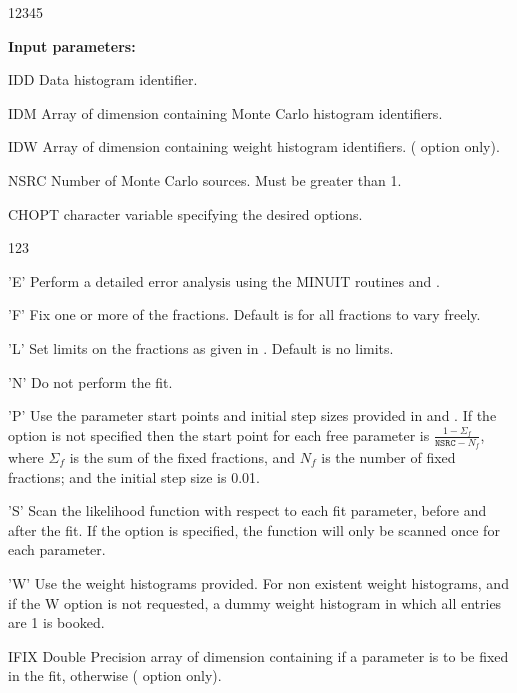 \begin{DLtt}{12345}
\item[{\rm\bf Input parameters:}]
\item[IDD] Data histogram identifier.
\item[IDM] Array of dimension  containing Monte Carlo histogram 
           identifiers.
\item[IDW] Array of dimension  containing weight histogram 
           identifiers. ( option only).
\item[NSRC] Number of Monte Carlo sources.  Must be greater than 1.
\item[CHOPT] character variable specifying the desired options.
\begin{DLtt}{123}
\item['E'] Perform a detailed error analysis using the MINUIT routines
            and . 
\item['F'] Fix one or more of the fractions.  Default is for all fractions
           to vary freely.
\item['L'] Set limits on the fractions as given in .  Default 
           is no limits.
\item['N'] Do not perform the fit.
\item['P'] Use the parameter start points and initial step sizes provided 
           in  and . 
           If the  option is
           not specified then the start point for each free parameter is
           $\frac{\textstyle 1 - \Sigma_{f}}{\textstyle\mathtt{NSRC}-N_{f}}$, 
           where $\Sigma_{f}$ is the sum of the fixed fractions, and 
           $N_{f}$ is the number of fixed fractions; 
           and the initial step size is 0.01.
\item['S'] Scan the likelihood function with respect to each fit parameter,
           before and after the fit.  
           If the  option is specified, the function 
           will only be scanned once for each parameter.
\item['W'] Use the weight histograms provided.  For non existent weight 
           histograms, and if the W option is not requested, a dummy 
           weight histogram in which all entries are 1 is booked.
\end{DLtt}
\item[IFIX] Double Precision array of dimension  containing  if a 
            parameter is to be fixed in the fit,  otherwise
            ( option only).

\end{DLtt}
